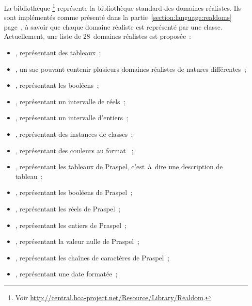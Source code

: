 La bibliothèque \footnote{Voir
\url{http://central.hoa-project.net/Resource/Library/Realdom}.} représente la
bibliothèque standard des domaines réalistes. Ils sont implémentés comme
présenté dans la partie~\ref{section:language:realdoms}
page~\pageref{section:language:realdoms}, à savoir que chaque domaine réaliste
est représenté par une classe.  Actuellement, une liste de 28~domaines réalistes
est proposée~:
%
\begin{itemize}

\item {}, représentant des tableaux~;

\item {}, un sac pouvant contenir plusieurs domaines réalistes de
natures différentes~;

\item {}, représentant les booléens~;

\item {}, représentant un intervalle de réels~;

\item {}, représentant un intervalle d'entiers~;

\item {}, représentant des instances de classes~;

\item {}, représentant des couleurs au format ~;

\item {}, représentant les tableaux de Praspel, c'est~à~dire une
description de tableau~;

\item {}, représentant les booléens de Praspel~;

\item {}, représentant les réels de Praspel~;

\item {}, représentant les entiers de Praspel~;

\item {}, représentant la valeur nulle de Praspel~;

\item {}, représentant les chaînes de caractères de Praspel~;

\item {}, représentant une date formatée~;


\end{itemize}
